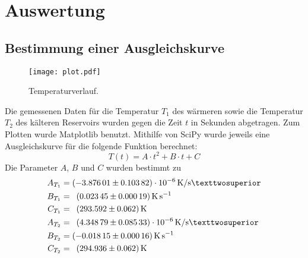 \section{Auswertung}
\label{sec:Auswertung}

\subsection{Bestimmung einer Ausgleichskurve}
\begin{figure}[H]
  \centering
  \texttt{[image: plot.pdf]}
  \caption{Temperaturverlauf.}
  \label{fig:plot}
\end{figure}
Die gemessenen Daten für die Temperatur $T_1$ des wärmeren sowie die Temperatur
$T_2$ des kälteren Reservoirs wurden gegen die Zeit $t$ in Sekunden abgetragen.
Zum Plotten wurde Matplotlib \cite{matplotlib} benutzt.
Mithilfe von SciPy \cite{scipy} wurde jeweils eine Ausgleichskurve für die folgende Funktion
berechnet:
\begin{equation}
  T(t)=A \cdot t^2 + B \cdot t + C
\end{equation}
Die Parameter $A$, $B$ und $C$ wurden bestimmt zu
\begin{align*}
A_{T_1} &= \SI{-3.87601 +- 0.10382e-6}{\kelvin\per\second²} \\
B_{T_1} &= \phantom{1}\SI{0.02345 +- 0.00019}{\kelvin\per\second} \\
C_{T_1} &= \phantom{1}\SI{293.592 +- 0.062}{\kelvin} \\
A_{T_2} &= \phantom{1}\SI{4.34879 +- 0.08533e-6}{\kelvin\per\second²}  \\
 B_{T_2} &= \SI{-0.01815 +- 0.00016}{\kelvin\per\second} \\
  C_{T_2} &= \phantom{1}\SI{294.936 +- 0.062}{\kelvin}
\end{align*}

